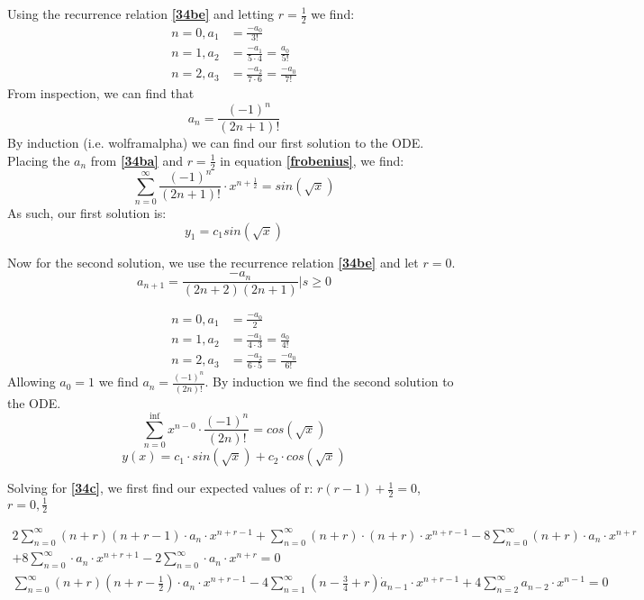 \documentclass{article}
\begin{document}
Using the recurrence relation \textbf{\ref{34be}} and letting $r=\frac{1}{2}$ we find:
\begin{align*}
n=0, a_1 &= \frac{-a_0}{3!}\\
n=1, a_2 &= \frac{-a_1}{5 \cdot 4} = \frac{a_0}{5!}\\
n=2, a_3 &= \frac{-a_2}{7 \cdot 6} = \frac{-a_0}{7!}
\end{align*}
From inspection, we can find that
\begin{equation}\label{34ba}
a_n = \frac{(-1)^n}{(2n+1)!}
\end{equation}
By induction (i.e. wolframalpha) we can find our first solution to the ODE. Placing the $a_n$ from \textbf{\ref{34ba}} and $ r = \frac{1}{2} $ in equation \textbf{\ref{frobenius}}, we find:
\[
\sum_{n=0}^{\infty}{\frac{(-1)^n}{(2n+1)!} \cdot x^{n+\frac{1}{2}}} = sin(\sqrt{x})
\]
As such, our first solution is:
\[y_1 = c_1sin(\sqrt{x})
\]

Now for the second solution, we use the recurrence relation \textbf{\ref{34be}} and let $r=0$.
\[
a_{n+1} = \frac{-a_n}{(2n+2)(2n+1)} \Bigr| s\geq0
\]

\begin{align*}
n=0, a_1 &= \frac{-a_0}{2}\\
n=1, a_2 &= \frac{-a_1}{4 \cdot 3} = \frac{a_0}{4!}\\
n=2, a_3 & = \frac{-a_2}{6 \cdot 5} = \frac{-a_0}{6!}
\end{align*}
Allowing $a_0=1$ we find $a_n = \frac{(-1)^n}{(2n)!}$.
By induction we find the second solution to the ODE.
\[
\sum_{n=0}^{\inf} x^{n-0} \cdot \frac{(-1)^n}{(2n)!} = cos(\sqrt{x})
\]
\[
y(x) = c_1 \cdot sin(\sqrt{x}) + c_2 \cdot cos(\sqrt{x})
\]
\par

Solving for \textbf{\ref{34c}}, we first find our expected values of r: $r(r-1)+\frac{1}{2} =0$, $r = 0,\frac{1}{2}$

\begin{align*}
2\sum_{n=0}^{\infty}(n+r)(n+r-1) \cdot a_n \cdot x^{n+r-1} + \sum_{n=0}^{\infty} (n+r) \cdot (n+r) \cdot x^{n+r-1} - 8\sum_{n=0}^{\infty} (n+r) \cdot a_n \cdot x^{n+r}\\
+ 8 \sum_{n=0}^{\infty} \cdot a_n \cdot x^{n+r+1} - 2 \sum_{n=0}^{\infty} \cdot a_n \cdot x^{n+r} =0\\
\sum_{n=0}^{\infty} (n+r)(n+r-\frac{1}{2}) \cdot a_n \cdot x^{n+r-1} - 4 \sum_{n=1}^{\infty} (n-\frac{3}{4}+r) \dot a_{n-1} \cdot x^{n+r-1} + 4\sum_{n=2}^{\infty} a_{n-2} \cdot x^{n-1} = 0
\end{align*}
\end{document}
